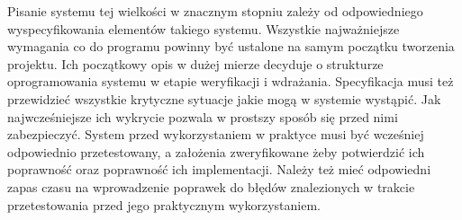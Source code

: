 \documentclass[archivemod, eng]{mgr}
\begin{document}
	Pisanie systemu tej wielkości w znacznym stopniu zależy od odpowiedniego wyspecyfikowania elementów takiego systemu. Wszystkie najważniejsze wymagania co do programu powinny być ustalone na samym początku tworzenia projektu. Ich początkowy opis w dużej mierze decyduje o strukturze oprogramowania systemu w etapie weryfikacji i wdrażania.  Specyfikacja musi też przewidzieć wszystkie krytyczne sytuacje jakie mogą w systemie wystąpić. Jak najwcześniejsze ich wykrycie pozwala w prostszy sposób się przed nimi zabezpieczyć. System przed wykorzystaniem w praktyce musi być wcześniej odpowiednio przetestowany, a założenia zweryfikowane żeby potwierdzić ich poprawność oraz poprawność ich implementacji. Należy też mieć odpowiedni zapas czasu na wprowadzenie poprawek do błędów znalezionych w trakcie przetestowania przed jego praktycznym wykorzystaniem.
			
	
	
			
\end{document}
